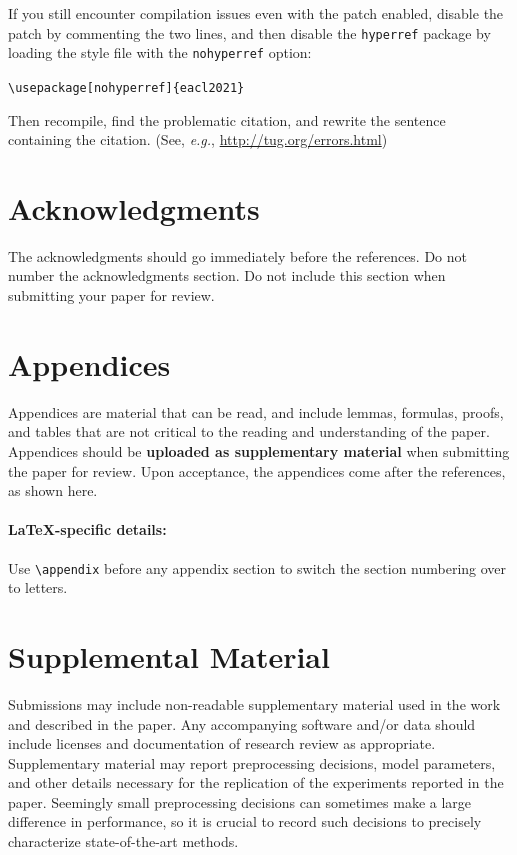 \documentclass[11pt,a4paper]{article}
\begin{document}
If you still encounter compilation issues even with the patch enabled, disable the patch by commenting the two lines, and then disable the \texttt{\small hyperref} package by loading the style file with the \texttt{\small nohyperref} option:

\noindent
{\small\verb|\usepackage[nohyperref]{eacl2021}|}

\noindent
Then recompile, find the problematic citation, and rewrite the sentence containing the citation. (See, {\em e.g.}, \url{http://tug.org/errors.html})

\section*{Acknowledgments}

The acknowledgments should go immediately before the references. Do not number the acknowledgments section.
Do not include this section when submitting your paper for review.




\appendix

\section{Appendices}
\label{sec:appendix}
Appendices are material that can be read, and include lemmas, formulas, proofs, and tables that are not critical to the reading and understanding of the paper. 
Appendices should be \textbf{uploaded as supplementary material} when submitting the paper for review.
Upon acceptance, the appendices come after the references, as shown here.

\paragraph{\LaTeX-specific details:}
Use {\small\verb|\appendix|} before any appendix section to switch the section numbering over to letters.


\section{Supplemental Material}
\label{sec:supplemental}
Submissions may include non-readable supplementary material used in the work and described in the paper.
Any accompanying software and/or data should include licenses and documentation of research review as appropriate.
Supplementary material may report preprocessing decisions, model parameters, and other details necessary for the replication of the experiments reported in the paper.
Seemingly small preprocessing decisions can sometimes make a large difference in performance, so it is crucial to record such decisions to precisely characterize state-of-the-art methods. 
\end{document}
